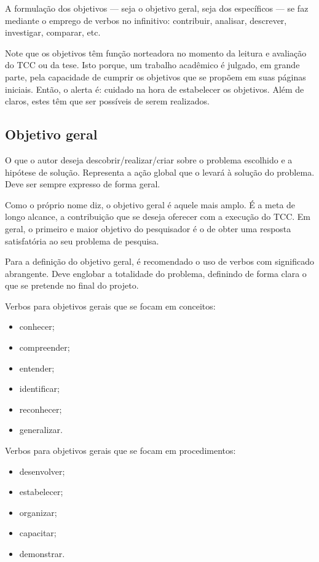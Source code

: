 A formulação dos objetivos --- seja o objetivo geral, seja dos específicos ---
se faz mediante o emprego de verbos no infinitivo: contribuir, analisar,
descrever, investigar, comparar, etc.

Note que os objetivos têm função norteadora no momento da leitura e avaliação do
TCC ou da tese. Isto porque, um trabalho acadêmico é julgado, em grande parte,
pela capacidade de cumprir os objetivos que se propõem em suas páginas
iniciais. Então, o alerta é: cuidado na hora de estabelecer os objetivos. Além
de claros, estes têm que ser possíveis de serem realizados.

\subsection{Objetivo geral}
\label{sec:intro:obj:ger}

O que o autor deseja descobrir/realizar/criar sobre o problema escolhido e a
hipótese de solução. Representa a ação global que o levará à solução do
problema. Deve ser sempre expresso de forma geral.

Como o próprio nome diz, o objetivo geral é aquele mais amplo. É a meta de longo
alcance, a contribuição que se deseja oferecer com a execução do TCC. Em geral,
o primeiro e maior objetivo do pesquisador é o de obter uma resposta
satisfatória ao seu problema de pesquisa.

Para a definição do objetivo geral, é recomendado o uso de verbos com
significado abrangente. Deve englobar a totalidade do problema, definindo de
forma clara o que se pretende no final do projeto.

Verbos para objetivos gerais que se focam em conceitos:
\begin{itemize}
\item conhecer;
\item compreender;
\item entender;
\item identificar;
\item reconhecer;
\item generalizar.
\end{itemize}

Verbos para objetivos gerais que se focam em procedimentos:
\begin{itemize}
\item desenvolver;
\item estabelecer;
\item organizar;
\item capacitar;
\item demonstrar.
\end{itemize}

